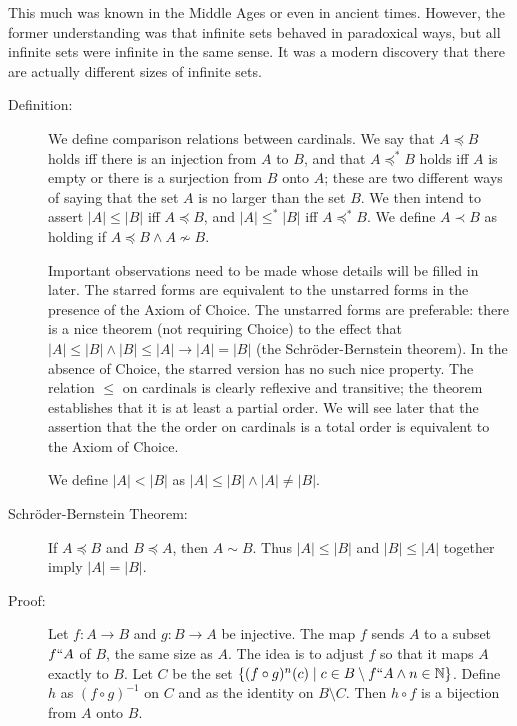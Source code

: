 \documentclass[12pt]{book}
\begin{document}
This much was known in the Middle Ages or even in ancient times.  However, the former understanding was that infinite sets behaved in paradoxical ways, but all infinite sets were infinite in the same sense.  It was a modern discovery that there are actually different sizes of infinite sets.

\begin{description}

\item[Definition:]  We define comparison relations between cardinals.  We say that $A \preceq B$ holds iff there is an injection from $A$ to $B$, and that $A \preceq^* B$ holds iff $A$ is empty or there is a surjection from $B$ onto $A$;  these are two different ways of saying that the set $A$ is no larger than the set $B$.  We then intend to assert $|A| \leq |B|$ iff $A \preceq B$, and $|A| \leq^* |B|$ iff $A \preceq^* B$.  We define $A \prec B$ as holding if $A \preceq B \wedge A \not\sim B$.

Important observations need to be made whose details will be filled in later.  The starred forms are equivalent to the unstarred forms in the presence of the Axiom of Choice.  The unstarred forms are preferable:  there is a nice theorem (not requiring Choice) to the effect that $|A| \leq |B| \wedge |B| \leq |A| \rightarrow |A|=|B|$ (the Schr\"oder-Bernstein theorem).  In the absence of Choice, the starred version has no such nice property.  The relation $\leq$ on cardinals is clearly reflexive and transitive;  the theorem establishes that it is at least a partial order.  We will see later that the assertion that the the order on cardinals is a total order is equivalent to the Axiom of Choice.

We define $|A|<|B|$ as $|A| \leq |B| \wedge |A|\neq |B|$.

\item[Schr\"oder-Bernstein Theorem:]  If $A \preceq B$ and $B \preceq A$, then $A \sim B$.  Thus $|A| \leq |B|$ and $|B| \leq |A|$ together imply $|A|=|B|$.

\item[Proof:]  Let $f:A \rightarrow B$ and $g:B \rightarrow A$ be injective.  The map $f$ sends $A$ to a subset $f``A$ of $B$, the same size as 
$A$.  The idea is to adjust $f$ so that it maps $A$ exactly to $B$.  Let $C$ be the set $\{(f\circ g)^n(c) \mid c \in B \setminus f``A \wedge n \in {\mathbb N}\}$.  Define $h$ as $(f \circ g)^{-1}$ on $C$ and as the identity on $B \setminus C$.  Then $h \circ f$ is a bijection from $A$ onto $B$.

\end{description}
\end{document}
